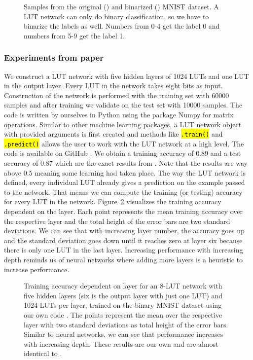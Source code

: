 \begin{figure}[!htb]
\begin{minipage}[b]{.4\linewidth}
      \label{fig:mnist_dataset_binarized}
  \end{minipage}
  \caption{Samples from the original () and binarized () MNIST dataset. A LUT network can only do binary classification, so we have to binarize the labels as well. Numbers from 0-4 get the label 0 and numbers from 5-9 get the label 1.}
\label{fig:mnist_dataset}
\end{figure}

\subsubsection{Experiments from paper}
We construct a LUT network with five hidden layers of 1024 LUTs and one LUT in the output layer. Every LUT in the network takes eight bits as input. Construction of the network is performed with the training set with 60000 samples and after training we validate on the test set with 10000 samples. The code is written by ourselves in Python using the package Numpy \cite{harris2020array} for matrix operations. Similar to other machine learning packages, a LUT network object with provided arguments is first created and methods like \hl{\texttt{.train()}} and \hl{\texttt{.predict()}} allows the user to work with the LUT network at a high level. The code is available on GitHub \cite{lut_github}. We obtain a training accuracy of 0.89 and a test accuracy of 0.87 which are the exact results from \cite{chatterjee2018learning}. Note that the results are way above 0.5 meaning some learning had taken place. The way the LUT network is defined, every individual LUT already gives a prediction on the example passed to the network. That means we can compute the training (or testing) accuracy for every LUT in the network. Figure~\ref{fig:ex1_depth_performance} visualizes the training accuracy dependent on the layer. Each point represents the mean training accuracy over the respective layer and the total height of the error bars are two standard deviations. We can see that with increasing layer number, the accuracy goes up and the standard deviation goes down until it reaches zero at layer six because there is only one LUT in the last layer. Increasing performance with increasing depth reminds us of neural networks where adding more layers is a heuristic to increase performance.

\begin{figure}[!htb]
    \centering
    
    \caption{Training accuracy dependent on layer for an 8-LUT network with five hidden layers (six is the output layer with just one LUT) and 1024 LUTs per layer, trained on the binary MNIST dataset using our own code \cite{lut_github}. The points represent the mean over the respective layer with two standard deviations as total height of the error bars. Similar to neural networks, we can see that performance increases with increasing depth. These results are our own and are almost identical to \cite{chatterjee2018learning}.}
\label{fig:ex1_depth_performance}
\end{figure}
\FloatBarrier


